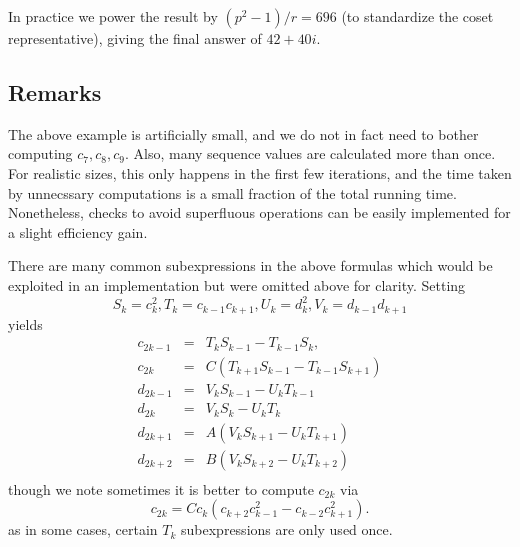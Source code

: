In practice we power the result by
$(p^2 - 1)/r = 696$ (to standardize the coset representative),
giving the final answer of $42 + 40i$.

\subsection {Remarks}

The above example is artificially small, and we do not in fact need to bother
computing $c_7, c_8, c_9$. Also, many sequence values
are calculated more than once. For realistic sizes, this only happens in the
first few iterations, and the time taken by unnecssary computations
is a small fraction of the total running time. Nonetheless, checks to avoid
superfluous operations can be easily implemented for a slight efficiency gain.

There are many common subexpressions in the above formulas which
would be exploited in an implementation but were omitted above
for clarity. Setting
\[
S_k = c_k^2, T_k = c_{k-1} c_{k+1}, U_k = d_k^2, V_k = d_{k-1}d_{k+1}
\]
yields
\[
\begin{array}{lcl}
    c_{2k-1} &=& T_k S_{k-1} - T_{k-1} S_k, \\
    c_{2k} &=& C(T_{k+1} S_{k-1} - T_{k-1} S_{k+1}) \\
    d_{2k-1} &=& V_k S_{k-1} - U_k T_{k-1} \\ 
    d_{2k} &=& V_k S_{k} - U_k T_k \\
    d_{2k+1} &=& A(V_k S_{k+1} - U_k T_{k+1}) \\
    d_{2k+2} &=& B(V_k S_{k+2} - U_k T_{k+2}) \\
\end{array}
\]
though we note sometimes it is better to compute $c_{2k}$ via
\[
    c_{2k} = C c_k (c_{k+2} c_{k-1}^2 - c_{k-2} c_{k+1}^2).
\]
as in some cases, certain $T_k$ subexpressions are only used once.
